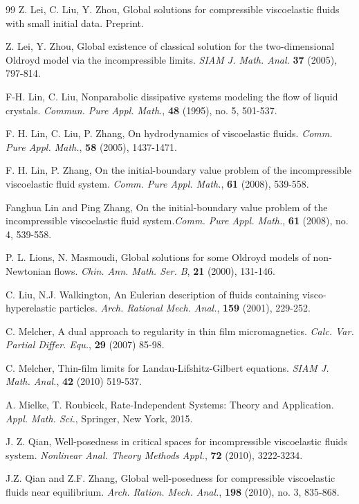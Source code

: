 \documentclass[reqno,11pt]{amsart}
\numberwithin{equation}{section}
\begin{document}
\begin{thebibliography}{99}
 Z. Lei, C. Liu, Y. Zhou, Global solutions for compressible viscoelastic fluids with small initial data. Preprint.

 Z. Lei, Y. Zhou, Global existence of classical solution for the two-dimensional Oldroyd model via the incompressible limits. \textit{SIAM J. Math. Anal.} \textbf{37} (2005), 797-814.

 F-H. Lin, C. Liu, Nonparabolic dissipative systems modeling the flow of liquid crystals. {\em Commun. Pure Appl. Math.}, \textbf{48} (1995), no. 5, 501-537.

 F. H. Lin, C. Liu, P. Zhang, On hydrodynamics of viscoelastic fluids. \textit{Comm. Pure Appl. Math.}, \textbf{58} (2005), 1437-1471. 

 F. H. Lin, P. Zhang, On the initial-boundary value problem of the incompressible viscoelastic fluid system. \textit{Comm. Pure Appl. Math.}, \textbf{61} (2008), 539-558.

Fanghua Lin and Ping Zhang, On the initial-boundary value problem of the incompressible viscoelastic fluid system.\emph{Comm. Pure Appl. Math.},  {\bf 61} (2008), no. 4, 539-558. 

 P. L. Lions, N. Masmoudi, Global solutions for some Oldroyd models of non-Newtonian flows. \textit{Chin. Ann. Math. Ser. B}, \textbf{21} (2000), 131-146. 

 C. Liu, N.J. Walkington, An Eulerian description of fluids containing visco-hyperelastic particles. \textit{Arch. Rational Mech. Anal.}, \textbf{159} (2001), 229-252.

 C. Melcher, A dual approach to regularity in thin film micromagnetics. {\em Calc. Var. Partial Differ. Equ.}, \textbf{29} (2007) 85-98.

 C. Melcher, Thin-film limits for Landau-Lifshitz-Gilbert equations. {\em SIAM J. Math. Anal.}, \textbf{42} (2010) 519-537.

 A. Mielke, T. Roubicek, Rate-Independent Systems: Theory and Application. {\em Appl. Math. Sci.}, Springer, New York, 2015.

 J. Z. Qian, Well-posedness in critical spaces for incompressible viscoelastic fluids system. \textit{Nonlinear Anal. Theory Methods Appl.}, \textbf{72} (2010), 3222-3234. 

 J.Z. Qian and Z.F. Zhang, Global well-posedness for compressible viscoelastic fluids near equilibrium. {\em Arch. Ration. Mech. Anal.}, {\bf 198} (2010), no. 3, 835-868.


\end{thebibliography}
\end{document}
